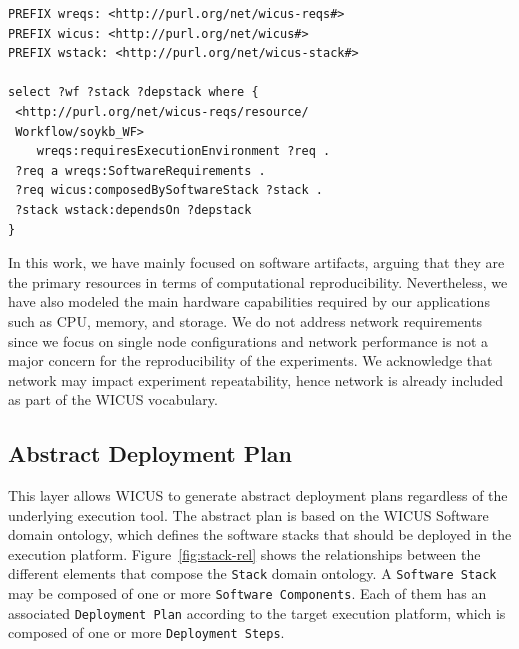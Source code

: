 \begin{lstlisting}[caption={WICUS SPARQL query example.}, label={lst:wicus-query}, basicstyle=\scriptsize]
PREFIX wreqs: <http://purl.org/net/wicus-reqs#> 
PREFIX wicus: <http://purl.org/net/wicus#> 
PREFIX wstack: <http://purl.org/net/wicus-stack#> 

select ?wf ?stack ?depstack where {
 <http://purl.org/net/wicus-reqs/resource/
 Workflow/soykb_WF> 
    wreqs:requiresExecutionEnvironment ?req .
 ?req a wreqs:SoftwareRequirements .
 ?req wicus:composedBySoftwareStack ?stack .
 ?stack wstack:dependsOn ?depstack 
}
\end{lstlisting}

In this work, we have mainly focused on software artifacts, arguing that 
they are the primary resources in terms of computational reproducibility. 
Nevertheless, we have also modeled the main hardware capabilities required 
by our applications such as CPU, memory, and storage. We do not address 
network requirements since we focus on single node configurations and 
network performance is not a major concern for the reproducibility of the
experiments. We acknowledge that network may impact experiment repeatability,
hence network is already included as part of the WICUS vocabulary.




\subsection{Abstract Deployment Plan}

This layer allows WICUS to generate abstract deployment plans regardless of the
underlying execution tool. The abstract plan is based on the WICUS Software~\cite{wicus} 
domain ontology, which defines the software stacks that should be deployed in the 
execution platform. Figure~\ref{fig:stack-rel} shows the relationships between the different
elements that compose the \texttt{Stack} domain ontology. A \texttt{Software Stack} may
be composed of one or more \texttt{Software Components}. Each of them has an associated 
\texttt{Deployment Plan} according to the target execution platform, which is composed of 
one or more \texttt{Deployment Steps}.

